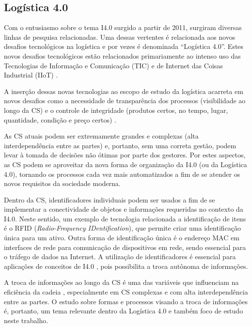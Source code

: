 \subsection{Logística 4.0}

Com o entusiasmo sobre o tema I4.0 surgido a partir de 2011, surgiram diversas linhas de pesquisa relacionadas. Uma dessas vertentes é relacionada aos novos desafios tecnológicos na logística e por vezes é denominada ``Logística 4.0''. Estes novos desafios tecnológicos estão relacionados primariamente ao intenso uso das Tecnologias de Informação e Comunicação (TIC) e de Internet das Coisas Industrial (IIoT) \cite{barreto2017industry}.

A inserção dessas novas tecnologias ao escopo de estudo da logística acarreta em novos desafios como a necessidade de transparência dos processos (visibilidade ao longo da CS) e o controle de integridade (produtos certos, no tempo, lugar, quantidade, condição e preço certos) \cite{barreto2017industry}.

As CS atuais podem ser extremamente grandes e complexas (alta interdependência entre as partes) e, portanto, sem uma correta gestão, podem levar à tomada de decisões não ótimas por parte dos gestores. Por estes aspectos, as CS podem se aproveitar da nova forma de organização da I4.0 (ou da Logística 4.0), tornando os processos cada vez mais automatizados a fim de se atender os novos requisitos da sociedade moderna.

Dentro da CS, identificadores individuais podem ser usados a fim de se implementar a conectividade de objetos e informações requeridas no contexto da I4.0. Neste sentido, um exemplo de tecnologia relacionada a identificação de itens é o RFID (\textit{Radio-Frequency IDentification}), que permite criar uma identificação única para um ativo. Outra forma de identificação única é o endereço MAC em interfaces de rede para comunicação de dispositivos em rede, sendo essencial para o tráfego de dados na Internet. A utilização de identificadores é essencial para aplicações de conceitos de I4.0 \cite{alyahya2016rfidwarehousing, vlachos2014rfidimpact, fan2015inventory, bibi2017rfidfood}, pois possibilita a troca autônoma de informações.

A troca de informações ao longo da CS é uma das variáveis que influenciam na eficiência da cadeia \cite{barreto2017industry}, especialmente em CS complexas e com alta interdependência entre as partes. O estudo sobre formas e processos visando a troca de informações é, portanto, um tema relevante dentro da Logística 4.0 e também foco de estudo neste trabalho.


